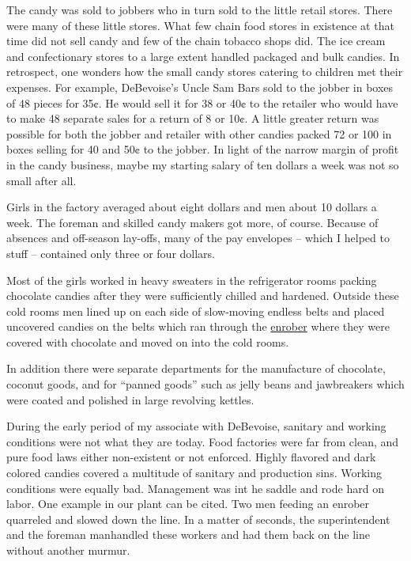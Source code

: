 \documentclass[12pt]{book}              %
\begin{document}
The candy was sold to jobbers who in turn sold to the little retail stores. There were many of these little stores. What few chain food stores in existence at that time did not sell candy and few of the chain tobacco shops did. The ice cream and confectionary stores to a large extent handled packaged and bulk candies. In retrospect, one wonders how the small candy stores catering to children met their expenses. For example, DeBevoise's Uncle Sam Bars sold to the jobber in boxes of 48 pieces for 35$\cent$. He would sell it for 38 or 40$\cent$ to the retailer who would have to make 48 separate sales for a return of 8 or 10$\cent$. A little greater return was possible for both the jobber and retailer with other candies packed 72 or 100 in boxes selling for 40 and 50$\cent$ to the jobber. In light of the narrow margin of profit in the candy business, maybe my starting salary of ten dollars a week was not so small after all.

Girls in the factory averaged about eight dollars and men about 10 dollars a week. The foreman and skilled candy makers got more, of course. Because of absences and off-season lay-offs, many of the pay envelopes -- which I helped to stuff -- contained only three or four dollars. 

Most of the girls worked in heavy sweaters in the refrigerator rooms packing chocolate candies after they were sufficiently chilled and hardened. Outside these cold rooms men lined up on each side of slow-moving endless belts and placed uncovered candies on the belts which ran through the \href{http://en.wikipedia.org/wiki/Enrober}{enrober} where they were covered with chocolate and moved on into the cold rooms.

In addition there were separate departments for the manufacture of chocolate, coconut goods, and for ``panned goods'' such as jelly beans and jawbreakers which were coated and polished in large revolving kettles. 

During the early period of my associate with DeBevoise, sanitary and working conditions were not what they are today. Food factories were far from clean, and pure food laws either non-existent or not enforced. Highly flavored and dark colored candies covered a multitude of sanitary and production sins. Working conditions were equally bad. Management was int he saddle and rode hard on labor. One example in our plant can be cited. Two men feeding an enrober quarreled and slowed down the line. In a matter of seconds, the superintendent and the foreman manhandled these workers and had them back on the line without another murmur.
\end{document}
